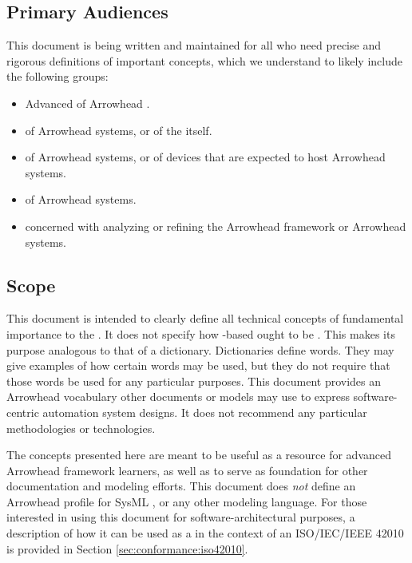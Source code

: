 \subsection{Primary Audiences}
\label{sec:introduction:audiences}

This document is being written and maintained for all who need precise and rigorous definitions of important  concepts, which we understand to likely include the following groups:

\begin{itemize}
\item Advanced  of Arrowhead .
\item {} of Arrowhead systems, or of the  itself.
\item {} of Arrowhead systems, or of devices that are expected to host Arrowhead systems.
\item {} of Arrowhead systems.
\item {} concerned with analyzing or refining the Arrowhead framework or Arrowhead systems.
\end{itemize}

\subsection{Scope}
\label{sec:introduction:scope}

This document is intended to clearly define all technical concepts of fundamental importance to the .
It does not specify how -based  ought to be .
This makes its purpose analogous to that of a dictionary.
Dictionaries define words.
They may give examples of how certain words may be used, but they do not require that those words be used for any particular purposes.
This document provides an Arrowhead vocabulary other documents or models may use to express software-centric automation system designs.
It does not recommend any particular methodologies or technologies.

The concepts presented here are meant to be useful as a resource for advanced Arrowhead framework learners, as well as to serve as foundation for other documentation and modeling efforts.
This document does \textit{not} define an Arrowhead profile for SysML \cite{omg2019sysml}, or any other modeling language.
For those interested in using this document for software-architectural purposes, a description of how it can be used as a  in the context of an ISO/IEC/IEEE 42010  is provided in Section \ref{sec:conformance:iso42010}.

